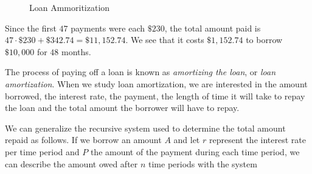 \documentclass[10pt,]{book}
\theoremstyle{ptxdefinitionnotitle}
\theoremstyle{ptxdefinitiontitle}
\theoremstyle{ptxdefinitionnotitle}
\theoremstyle{ptxdefinitiontitle}
\theoremstyle{ptxdefinitionnotitle}
\theoremstyle{ptxdefinitiontitle}
\numberwithin{equation}{section}
\begin{document}
\begin{figure}
\centering
\begin{sidebyside}{2}{0}{0}{0}
\begin{sbspanel}{0.3}
\end{sbspanel}
\begin{sbspanel}{0.7}
\end{sbspanel}
\end{sidebyside}
\caption{Loan Ammoritization\label{loan-balance}}
\end{figure}
\hypertarget{p-41}{}%
Since the first \(47\) payments were each \(\$230\), the total amount paid is \(47\cdot \$230 + \$342.74 = \$11,152.74\).  We see that it costs \(\$1,152.74\) to borrow \(\$10,000\) for \(48\) months.%
\par
\hypertarget{p-42}{}%
The process of paying off a loan is known as \emph{amortizing the loan}, or \emph{loan amortization}. When we study loan amortization, we are interested in the amount borrowed, the interest rate, the payment, the length of time it will take to repay the loan and the total amount the borrower will have to repay.%
\par
\hypertarget{p-43}{}%
We can generalize the recursive system used to determine the total amount repaid as follows.  If we borrow an amount \(A\) and let \(r\) represent the interest rate per time period and \(P\) the amount of the payment during each time period, we can describe the amount owed after \(n\) time periods with the system%
\end{document}

